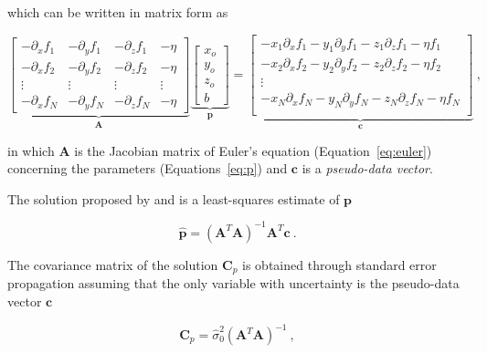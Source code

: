 \noindent
which can be written in matrix form as

\begin{equation}
  \underbrace{
    \begin{bmatrix}
      -\partial_x f_1 & -\partial_y f_1 & -\partial_z f_1 & -\eta \\
      -\partial_x f_2 & -\partial_y f_2 & -\partial_z f_2 & -\eta \\
      \vdots & \vdots & \vdots & \vdots \\
      -\partial_x f_N & -\partial_y f_N & -\partial_z f_N & -\eta
    \end{bmatrix}
  }_{\mathbf{A}}
  \underbrace{
    \begin{bmatrix}
      x_o \\ y_o \\ z_o \\ b
    \end{bmatrix}
  }_{\mathbf{p}}
  =
  \underbrace{
    \begin{bmatrix}
      -x_1\partial_x f_1 - y_1\partial_y f_1 - z_1\partial_z f_1 - \eta f_1 \\
      -x_2\partial_x f_2 - y_2\partial_y f_2 - z_2\partial_z f_2 - \eta f_2 \\
      \vdots \\
      -x_N\partial_x f_N - y_N\partial_y f_N - z_N\partial_z f_N - \eta f_N \\
    \end{bmatrix}
  }_{\mathbf{c}}
  \ ,
  \label{eq:deconv-system}
\end{equation}

\noindent
in which $\mathbf{A}$ is the Jacobian matrix of Euler's equation
(Equation~\ref{eq:euler}) concerning the parameters
(Equations~\ref{eq:p})
and $\mathbf{c}$ is a \textit{pseudo-data vector}.

The solution proposed by \citet{Thompson1982} and \citet{Reid1990} is a
least-squares estimate of $\mathbf{p}$

\begin{equation}
  \hat{\mathbf{p}} = \left(\mathbf{A}^T\mathbf{A}\right)^{-1}
  \mathbf{A}^T\mathbf{c}
  \ .
  \label{eq:deconv-p}
\end{equation}

\noindent
The covariance matrix of the solution $\mathbf{C}_p$ is obtained through
standard error propagation assuming that the only variable with uncertainty
is the pseudo-data vector $\mathbf{c}$

\begin{equation}
  \mathbf{C}_p = \hat{\sigma}_0^2 \left(\mathbf{A}^T\mathbf{A}\right)^{-1}
  \ ,
  \label{eq:deconv-cov}
\end{equation}

